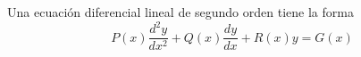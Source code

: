 
Una ecuación diferencial lineal de segundo orden tiene la forma
\begin{equation}
P(x) \frac{d^2y}{dx^2} + Q(x) \frac{dy}{dx} + R(x)y = G(x) \tag{15.23}
\end{equation}
